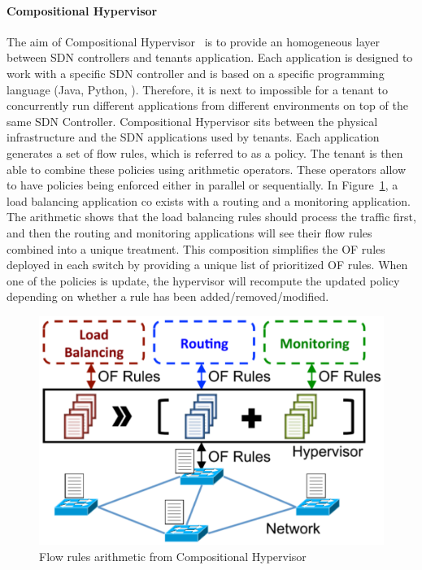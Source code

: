 \paragraph{Compositional Hypervisor}
The aim of Compositional Hypervisor~\cite{CompositionalHypervisor-Jin2014} is to provide an homogeneous layer between SDN controllers and tenants application.
Each application is designed to work with a specific SDN controller and is based on a specific programming language (Java, Python, \etc). Therefore, it is next to impossible for a tenant to concurrently run different applications from different environments on top of the same SDN Controller. Compositional Hypervisor sits between the physical infrastructure and the SDN applications used by tenants.
Each application generates a set of flow rules, which is referred to as a policy.
The tenant is then able to combine these policies using arithmetic operators.
These operators allow to have policies being enforced either in parallel or sequentially. 
In Figure~\ref{fig:compositional-hyp}, a load balancing application co exists with a routing and a monitoring application. The arithmetic shows that the load balancing rules should process the traffic first, and then the routing and monitoring applications will see their flow rules combined into a unique treatment.
This composition simplifies the OF rules deployed in each switch by providing a unique list of prioritized OF rules. When one of the policies is update, the hypervisor will recompute the updated policy depending on whether a rule has been added/removed/modified.

\begin{figure}[ht]
    \centering
    \includegraphics[scale=0.7]{figures/compositional-structure.pdf}
    \caption{Flow rules arithmetic from Compositional Hypervisor~\cite{CompositionalHypervisor-Jin2014}}
    \label{fig:compositional-hyp}
\end{figure}

